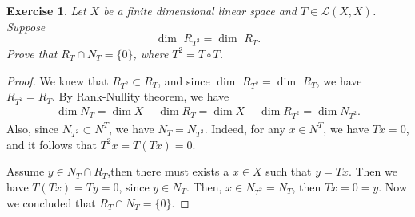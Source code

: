 \documentclass[11pt]{book}
\newtheorem{exercise}{Exercise}[section]
\theoremstyle{definition}
\numberwithin{equation}{chapter}
\begin{document}
\medskip

\begin{exercise}
Let $X$ be a finite dimensional linear space and $T\in\mathscr{L}(X,X)$. Suppose $$ \dim \,\, R_{T^2} =  \dim \,\, R_T.$$
Prove that $R_T\cap N_T = \{0\}$, where $T^2 = T\circ T$.
\end{exercise}
\begin{proof}
We knew that $R_{T^2}\subset R_T$, and since $ \dim \,\, R_{T^2} =  \dim \,\, R_T$, we have $R_{T^2} = R_T$. By Rank-Nullity theorem, we have
\begin{align*}
    \dim  N_T = \dim  X - \dim  R_T = \dim  X - \dim  R_{T^2} = \dim  N_{T^2}.
\end{align*}
Also, since $N_{T^2} \subset N^T$, we have $N_T = N_{T^2}$. Indeed, for any $x \in N^T$, we have $Tx = 0$, and it follows that $T^2x = T(Tx) = 0$. 

Assume $y\in N_T\cap R_T$,then there must exists a $x\in X$ such that $y = T x$. Then we have $T(Tx) = Ty = 0$, since $y\in N_T$. Then, $x\in N_{T^2} = N_T$, then $Tx = 0 = y$. Now we concluded that $R_T\cap N_T = \{0\}$.
\end{proof}

\medskip
\end{document}
